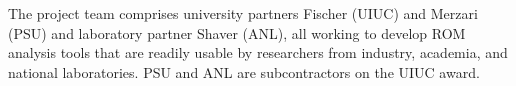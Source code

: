 

\vspace{.05in}



\noindent
The project team comprises university partners Fischer (UIUC) and Merzari (PSU)
and laboratory partner Shaver (ANL), all working to develop ROM analysis tools
that are readily usable by researchers from industry, academia, and national
laboratories.  PSU and ANL are subcontractors on the UIUC award.

